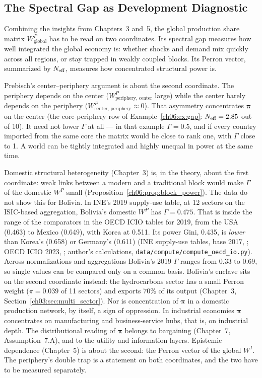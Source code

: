 \documentclass[../structural_economics_book.tex]{subfiles}
\begin{document}
\subsection{The Spectral Gap as Development Diagnostic}

\begin{prebisch}
Combining the insights from Chapters~3 and~5, the global production share matrix $W^P_{\text{global}}$ has to be read on two coordinates. Its spectral gap measures how well integrated the global economy is: whether shocks and demand mix quickly across all regions, or stay trapped in weakly coupled blocks. Its Perron vector, summarized by $N_{\text{eff}}$, measures how concentrated structural power is.

Prebisch's center--periphery argument is about the second coordinate. The periphery depends on the center ($W^P_{\text{periphery, center}}$ large) while the center barely depends on the periphery ($W^P_{\text{center, periphery}} \approx 0$). That asymmetry concentrates $\boldsymbol{\pi}$ on the center (the core-periphery row of Example~\ref{ch06:ex:gap}: $N_{\text{eff}} = 2.85$ out of 10). It need not lower $\Gamma$ at all --- in that example $\Gamma = 0.5$, and if every country imported from the same core the matrix would be close to rank one, with $\Gamma$ close to 1. A world can be tightly integrated and highly unequal in power at the same time.

Domestic structural heterogeneity (Chapter~3) is, in the theory, about the first coordinate: weak links between a modern and a traditional block would make $\Gamma$ of the domestic $W^P$ small (Proposition~\ref{ch06:prop:block_power}). The data do not show this for Bolivia. In INE's 2019 supply-use table, at 12 sectors on the ISIC-based aggregation, Bolivia's domestic $W^P$ has $\Gamma = 0.475$. That is inside the range of the comparators in the OECD ICIO tables for 2019, from the USA (0.463) to Mexico (0.649), with Korea at 0.511. Its power Gini, 0.435, is \textit{lower} than Korea's (0.658) or Germany's (0.611) (INE supply-use tables, base 2017, \citealp{ine2026sut}; OECD ICIO 2023, \citealp{oecd2023icio}; author's calculations, \texttt{data/compute/compute\_oecd\_io.py}). Across normalizations and aggregations Bolivia's 2019 $\Gamma$ ranges from 0.33 to 0.69, so single values can be compared only on a common basis. Bolivia's enclave sits on the second coordinate instead: the hydrocarbons sector has a small Perron weight ($\pi = 0.039$ of 11 sectors) and exports 70\% of its output (Chapter~3, Section~\ref{ch03:sec:multi_sector}). Nor is concentration of $\boldsymbol{\pi}$ in a domestic production network, by itself, a sign of oppression. In industrial economies $\boldsymbol{\pi}$ concentrates on manufacturing and business-service hubs, that is, on industrial depth. The distributional reading of $\boldsymbol{\pi}$ belongs to bargaining (Chapter~7, Assumption~7.A), and to the utility and information layers. Epistemic dependence (Chapter~5) is about the second: the Perron vector of the global $W^I$. The periphery's double trap is a statement on both coordinates, and the two have to be measured separately.
\end{prebisch}
\end{document}
